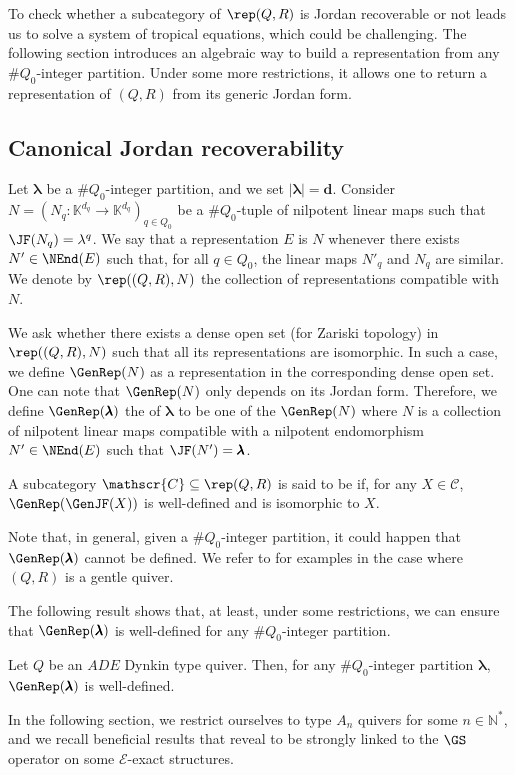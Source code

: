 To check whether a subcategory of $\rep(Q,R)$ is Jordan recoverable or not leads us to solve a system of tropical equations, which could be challenging. The following section introduces an algebraic way to build a representation from any $\#Q_0$-integer partition. Under some more restrictions, it allows one to return a representation of $(Q,R)$ from its generic Jordan form.

\subsection{Canonical Jordan recoverability}
\label{ss:CJR}

Let $\pmb{\lambda}$ be a $\#Q_0$-integer partition, and we set $|\pmb{\lambda}| = \pmb{d}$. Consider $N = \left(N_q : \mathbb{K}^{d_q} \longrightarrow \mathbb{K}^{d_q} \right)_{q \in Q_0}$ be a $\#Q_0$-tuple of nilpotent linear maps such that $\JF(N_q) = \lambda^q$. We say that a representation $E$ is  $N$ whenever there exists $N' \in \NEnd(E)$ such that, for all $q \in Q_0$, the linear maps $N'_q$ and $N_q$ are similar. We denote by $\rep((Q,R),N)$ the collection of representations compatible with $N$.

We ask whether there exists a dense open set (for Zariski topology) in $\rep((Q,R),N)$ such that all its representations are isomorphic. In such a case, we define $\GenRep(N)$ as a representation in the corresponding dense open set. One can note that $\GenRep(N)$ only depends on its Jordan form. Therefore, we define $\GenRep(\pmb{\lambda})$ the  of $\pmb{\lambda}$ to be one of the $\GenRep(N)$ where $N$ is a collection of nilpotent linear maps compatible with a nilpotent endomorphism $N' \in \NEnd(E)$ such that $\JF(N') = \pmb{\lambda}$.

\begin{definition} \label{def:CJR} A subcategory $\mathscr{C} \subseteq \rep(Q,R)$ is said to be  if, for any $X \in \mathscr{C}$, $\GenRep(\GenJF(X))$ is well-defined and is isomorphic to $X$.
\end{definition}

Note that, in general, given a $\#Q_0$-integer partition, it could happen that $\GenRep(\pmb{\lambda})$ cannot be defined. We refer to \cite[Examples 2.21 and 2.23]{D22} for examples in the case where $(Q,R)$ is a gentle quiver.

The following result shows that, at least, under some restrictions, we can ensure that $\GenRep(\pmb{\lambda})$ is well-defined for any $\#Q_0$-integer partition.

\begin{prop} \label{prop:GenRepDynkin}
    Let $Q$ be an $ADE$ Dynkin type quiver. Then, for any $\#Q_0$-integer partition $\pmb{\lambda}$, $\GenRep(\pmb{\lambda})$ is well-defined.
\end{prop}

In the following section, we restrict ourselves to type $A_n$ quivers for some $n \in \mathbb{N}^*$, and we recall beneficial results that reveal to be strongly linked to the $\GS$ operator on some $\mathcal{E}$-exact structures.
